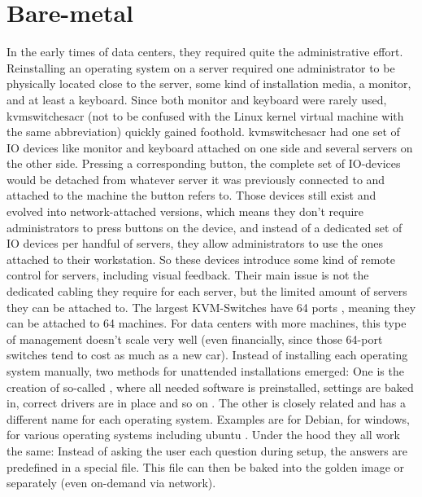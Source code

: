 \section{Bare-metal}
In the early times of data centers, they required quite the administrative effort. Reinstalling an operating system on a server required one administrator to be physically located close to the server, some kind of installation media, a monitor, and at least a keyboard. Since both monitor and keyboard were rarely used, \gls{kvmswitchesacr} (not to be confused with the Linux kernel virtual machine with the same abbreviation) quickly gained foothold. \Gls{kvmswitchesacr} had one set of IO devices like monitor and keyboard attached on one side and several servers on the other side. Pressing a corresponding button, the complete set of IO-devices would be  detached from whatever server it was previously connected to and attached to the machine the button refers to.
\newline
Those devices still exist and evolved into network-attached versions, which means they don't require administrators to press buttons on the device, and instead of a dedicated set of IO devices per handful of servers, they allow administrators to use the ones attached to their workstation. So these devices introduce some kind of remote control for servers, including visual feedback.
Their main issue is not the dedicated cabling they require for each server, but the limited amount of servers they can be attached to. The largest KVM-Switches have 64 ports \cite{64_port_kvm_switches}, meaning they can be attached to 64 machines. For data centers with more machines, this type of management doesn't scale very well (even financially, since those 64-port switches tend to cost as much as a new car).
\newline
Instead of installing each operating system manually, two methods for unattended installations emerged: One is the creation of so-called , where all needed software is preinstalled, settings are baked in, correct drivers are in place and so on \cite{what_golden_image}. The other is closely related and has a different name for each operating system. Examples are  for Debian,  for windows,  for various operating systems including ubuntu \cite{cloud_init_releases}. Under the hood they all work the same: Instead of asking the user each question during setup, the answers are predefined in a special file. This file can then be baked into the golden image or separately (even on-demand via network).

